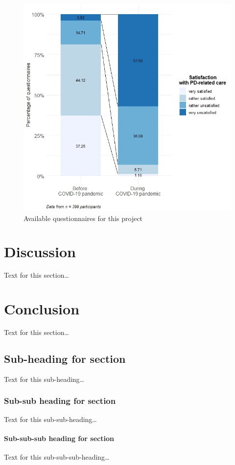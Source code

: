 \documentclass{bmcart}
\begin{document}
\begin{figure}
\centering
\includegraphics[width=.90\textwidth]{fig2.satisfaction.care.v1.0.jpeg}
\caption{Available questionnaires for this project}
\label{fig2:satisfaction}
\end{figure}

	\section*{Discussion}
	Text for this section\ldots
	\section*{Conclusion}
	Text for this section\ldots
	\subsection*{Sub-heading for section}
	Text for this sub-heading\ldots
	\subsubsection*{Sub-sub heading for section}
	Text for this sub-sub-heading\ldots
	\paragraph*{Sub-sub-sub heading for section}
	Text for this sub-sub-sub-heading\ldots
	
\end{document}
